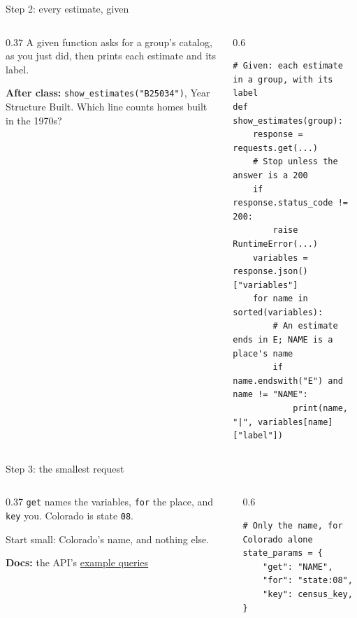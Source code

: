 \documentclass[9pt,aspectratio=169]{beamer}
\begin{document}
\begin{frame}[fragile]{Step 2: every estimate, given}
    \begin{columns}[T]
        \begin{column}{0.37\textwidth}
            A given function asks for a group's catalog, as you just did, then prints each estimate and its label.

            \medskip
            \textbf{After class:} \texttt{show\_estimates("B25034")}, Year Structure Built. Which line counts homes built in the 1970s?
        \end{column}
        \begin{column}{0.6\textwidth}
\begin{lstlisting}
# Given: each estimate in a group, with its label
def show_estimates(group):
    response = requests.get(...)
    # Stop unless the answer is a 200
    if response.status_code != 200:
        raise RuntimeError(...)
    variables = response.json()["variables"]
    for name in sorted(variables):
        # An estimate ends in E; NAME is a place's name
        if name.endswith("E") and name != "NAME":
            print(name, "|", variables[name]["label"])
\end{lstlisting}
        \end{column}
    \end{columns}
\end{frame}

\begin{frame}[fragile]{Step 3: the smallest request}
    \begin{columns}[T]
        \begin{column}{0.37\textwidth}
            \texttt{get} names the variables, \texttt{for} the place, and \texttt{key} you. Colorado is state \texttt{08}.

            \medskip
            Start small: Colorado's name, and nothing else.

            \medskip
            {\scriptsize\textbf{Docs:} the API's \href{https://api.census.gov/data/2024/acs/acs5/examples.html}{example queries}\par}
        \end{column}
        \begin{column}{0.6\textwidth}
\begin{lstlisting}
# Only the name, for Colorado alone
state_params = {
    "get": "NAME",
    "for": "state:08",
    "key": census_key,
}
\end{lstlisting}
        \end{column}
    \end{columns}
\end{frame}
\end{document}
